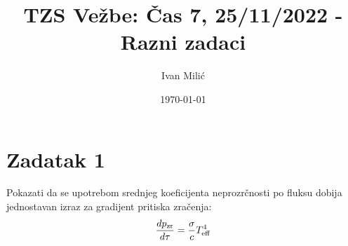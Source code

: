 \documentclass[12pt]{article}
\title{TZS Ve\v{z}be: \v{C}as 7, 25/11/2022 - Razni zadaci}
\author{Ivan Mili\'{c}}
\date{\today}
\begin{document}
\maketitle

\section*{Zadatak 1}

Pokazati da se upotrebom srednjeg koeficijenta neprozr\v{c}nosti po fluksu dobija jednostavan izraz za gradijent pritiska zra\v{c}enja:
\begin{equation}
\frac{dp_{\rm zr}}{d \tau} = \frac{\sigma}{c} T_{\rm eff}^4 
\end{equation}
\end{document}
